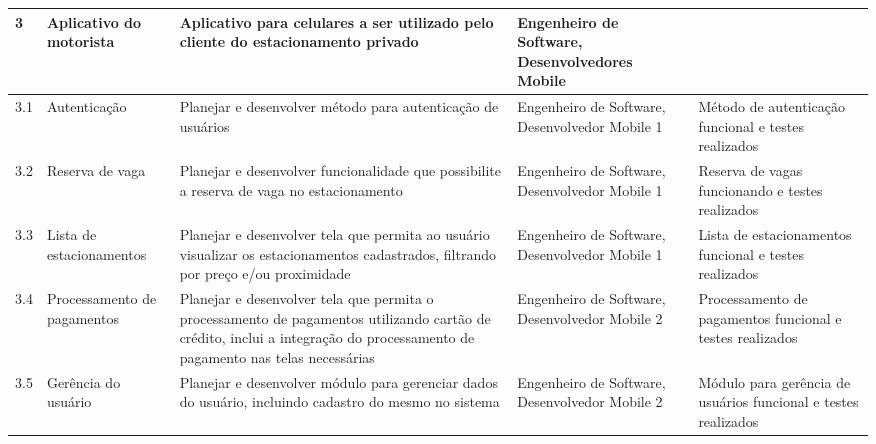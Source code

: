\begin{longtable}{  l  p{}  p{}  p{}  p{}  }
	\midrule
	3           & Aplicativo do motorista                                   & Aplicativo para celulares a ser utilizado pelo cliente do estacionamento privado                                                                                                 & Engenheiro de Software, Desenvolvedores Mobile                                                   &                                                                                                          \\*
	\midrule
	3.1         & Autenticação                                            & Planejar e desenvolver método para autenticação de usuários                                                                                                                  & Engenheiro de Software, Desenvolvedor Mobile 1                                                   & Método de autenticação funcional e testes realizados                                                  \\*
	\midrule
	3.2         & Reserva de vaga                                           & Planejar e desenvolver funcionalidade que possibilite a reserva de vaga no estacionamento                                                                                        & Engenheiro de Software, Desenvolvedor Mobile 1                                                   & Reserva de vagas funcionando e testes realizados                                                         \\*
	\midrule
	3.3         & Lista de estacionamentos                                  & Planejar e desenvolver tela que permita ao usuário visualizar os estacionamentos cadastrados, filtrando por preço e/ou proximidade                                             & Engenheiro de Software, Desenvolvedor Mobile 1                                                   & Lista de estacionamentos funcional e testes realizados                                                   \\*
	\midrule
	3.4         & Processamento de pagamentos                               & Planejar e desenvolver tela que permita o processamento de pagamentos utilizando cartão de crédito, inclui a integração do processamento de pagamento nas telas necessárias & Engenheiro de Software, Desenvolvedor Mobile 2                                                   & Processamento de pagamentos funcional e testes realizados                                                \\*
	\midrule
	3.5         & Gerência do usuário                                     & Planejar e desenvolver módulo para gerenciar dados do usuário, incluindo cadastro do mesmo no sistema                                                                          & Engenheiro de Software, Desenvolvedor Mobile 2                                                   & Módulo para gerência de usuários funcional e testes realizados                                        \\*

\end{longtable}
